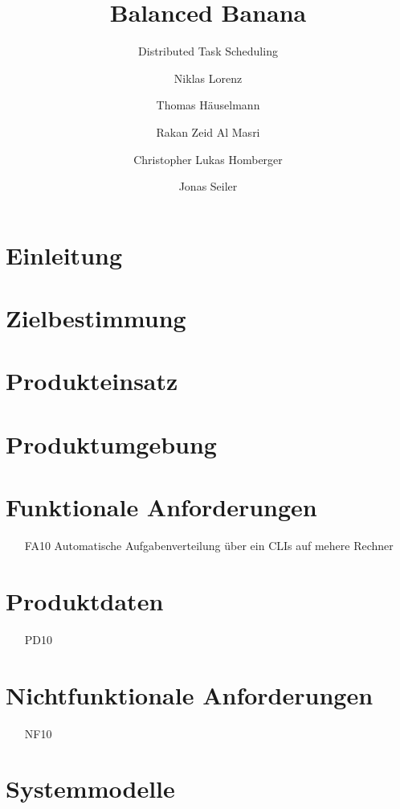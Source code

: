 \documentclass[parskip=full]{scrartcl}
\title{Balanced Banana}
\subtitle{Distributed Task Scheduling}
\author{Niklas Lorenz}
\author{Thomas Häuselmann}
\author{Rakan Zeid Al Masri}
\author{Christopher Lukas Homberger}
\author{Jonas Seiler}
\begin{document}
\maketitle

\section{Einleitung}

\section{Zielbestimmung}

\section{Produkteinsatz}

\section{Produktumgebung}

\section{Funktionale Anforderungen}
\begin{itemize}[nosep]
\item[FA10] Automatische Aufgabenverteilung über ein \glspl{CLI} auf mehere Rechner
\end{itemize}

\section{Produktdaten}
\begin{itemize}[nosep]
\item[PD10]
\end{itemize}

\section{Nichtfunktionale Anforderungen}
\begin{itemize}[nosep]
\item[NF10]
\end{itemize}

\section{Systemmodelle}
\end{document}
